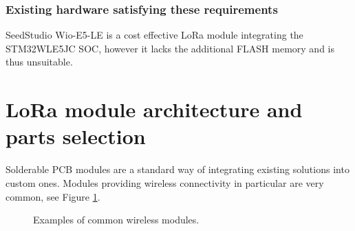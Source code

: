 \subsubsection{Existing hardware satisfying these requirements}
SeedStudio Wio-E5-LE \cite{stmicroelectronics_lora_2024, seeedstudio_wio-e5-wireless_2024} is a cost effective LoRa module integrating the STM32WLE5JC SOC, however it lacks the additional FLASH memory and is thus unsuitable.

\section{\label{section:module-architecture}LoRa module architecture and parts selection}
Solderable PCB modules are a standard way of integrating existing solutions into custom ones. Modules providing wireless connectivity in particular are very common, see Figure \ref{fig:wireless-modules}.

\begin{figure}
    \centering
    \caption{\label{fig:wireless-modules}Examples of common wireless modules.}
\end{figure}

